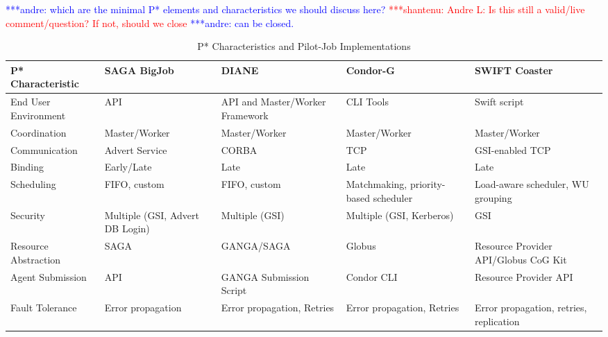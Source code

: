 \documentclass[conference,final]{IEEEtran}
\newcommand{\jhanote}[1]{ {\textcolor{red} { ***shantenu: #1 }}}
\newcommand{\alnote}[1]{ {\textcolor{blue} { ***andre: #1 }}}
\newcommand{\alnote}[1]{}
\newcommand{\jhanote}[1]{}
\newcommand{\up}{\vspace*{-1em}}
\begin{document}

\alnote{which are the minimal P* elements and characteristics we
  should discuss here?}  \jhanote{Andre L: Is this still a valid/live
  comment/question? If not, should we close}\alnote{can be closed.}

\begin{table}[t]
\centering
\begin{tabular}{|l|p{2.5cm}|p{2.5cm}|p{2.5cm}|p{2.5cm}|}
	\hline
	\textbf{P* Characteristic}
	&\textbf{SAGA BigJob} &\textbf{DIANE} &\textbf{Condor-G} &   
	\textbf{SWIFT Coaster} \\ \hline
End User Environment &API &API and Master/Worker Framework &CLI Tools &Swift script\\ \hline

Coordination &Master/Worker  &Master/Worker  &Master/Worker &Master/Worker \\ \hline
	
Communication &Advert Service &CORBA &TCP &GSI-enabled TCP \\ \hline

Binding &Early/Late &Late &Late &Late\\
\hline
Scheduling &FIFO, custom &FIFO, custom &Matchmaking, priority-based scheduler 
&Load-aware scheduler, WU grouping\\
\hline

Security &Multiple (GSI, Advert DB Login) &Multiple (GSI) &Multiple (GSI, 
Kerberos) &GSI\\ \hline

Resource Abstraction &SAGA &GANGA/SAGA &Globus &Resource Provider API/Globus CoG 
Kit \\ 
\hline
Agent Submission &API &GANGA Submission Script &Condor CLI 
&Resource Provider API\\
\hline
Fault Tolerance &Error propagation &Error propagation, Retries &Error propagation, Retries &Error propagation, retries, replication\\
\hline
	
\end{tabular}
\caption{P* Characteristics and Pilot-Job Implementations\up}\label{table:pilot-job-comparison}
\end{table}
\end{document}
